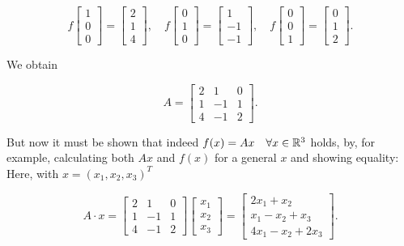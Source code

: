 \[
    f\begin{bmatrix}
        1 \\
        0 \\
        0
    \end{bmatrix} =
    \begin{bmatrix}
        2 \\
        1 \\
        4
    \end{bmatrix} , \quad
    f\begin{bmatrix}
        0 \\
        1 \\
        0
    \end{bmatrix} =
    \begin{bmatrix}
        1  \\
        -1 \\
        -1
    \end{bmatrix} , \quad
    f\begin{bmatrix}
        0 \\
        0 \\
        1
    \end{bmatrix} =
    \begin{bmatrix}
        0 \\
        1 \\
        2
    \end{bmatrix} .
\]

We obtain

\[
    A =
    \begin{bmatrix}
        2 & 1  & 0 \\
        1 & -1 & 1 \\
        4 & -1 & 2
    \end{bmatrix} .
\]

But now it must be shown that indeed \(f(x) = Ax \quad \forall x \in \mathbb{R}^3\) holds, by,
for example, calculating both \(Ax\) and \(f(x)\) for a
general \(x\) and showing equality: Here, with \(x = {(x_1, x_2, x_3)}^T\)

\[
    A \cdot x =
    \begin{bmatrix}
        2 & 1  & 0 \\
        1 & -1 & 1 \\
        4 & -1 & 2
    \end{bmatrix}
    \begin{bmatrix}
        x_1 \\
        x_2 \\
        x_3
    \end{bmatrix} =
    \begin{bmatrix}
        2x_1 + x_2      \\
        x_1 - x_2 + x_3 \\
        4x_1 - x_2 + 2x_3
    \end{bmatrix} .
\]

